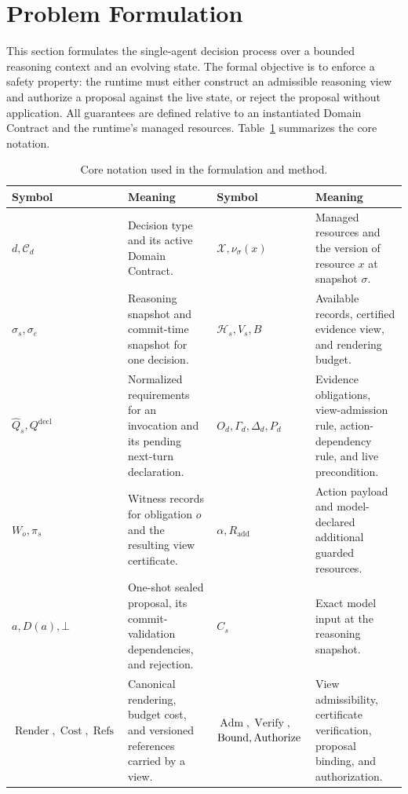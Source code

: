\section{Problem Formulation}
\label{sec:problem}
This section formulates the single-agent decision process over a bounded reasoning context and an evolving state. The formal objective is to enforce a safety property: the runtime must either construct an admissible reasoning view and authorize a proposal against the live state, or reject the proposal without application. All guarantees are defined relative to an instantiated Domain Contract and the runtime's managed resources. Table~\ref{tab:notation} summarizes the core notation.
\begin{table}[htbp]
    \centering
    \small
    \setlength{\tabcolsep}{4pt}
    \caption{Core notation used in the formulation and method.}
    \label{tab:notation}
    \begin{tabular}{@{}p{}p{}
                        p{}p{}@{}}
    \toprule
    \textbf{Symbol} & \textbf{Meaning}
    & \textbf{Symbol} & \textbf{Meaning} \\
    \midrule
    $d,\mathcal C_d$ &
    Decision type and its active Domain Contract.
    & $\mathcal X,\nu_{\sigma}(x)$ &
    Managed resources and the version of resource $x$ at snapshot $\sigma$.
    \\
    $\sigma_s,\sigma_e$ &
    Reasoning snapshot and commit-time snapshot for one decision.
    & $\mathcal H_s,V_s,B$ &
    Available records, certified evidence view, and rendering budget.
    \\
    $\widehat Q_s,Q^{\mathrm{decl}}$ &
    Normalized requirements for an invocation and its pending next-turn declaration.
    & $O_d,\Gamma_d,\Delta_d,P_d$ &
    Evidence obligations, view-admission rule, action-dependency rule, and live precondition.
    \\
    $W_o,\pi_s$ &
    Witness records for obligation $o$ and the resulting view certificate.
    & $\alpha,R_{\mathrm{add}}$ &
    Action payload and model-declared additional guarded resources.
    \\
    $a,D(a),\bot$ &
    One-shot sealed proposal, its commit-validation dependencies, and rejection.
    & $C_s$ &
    Exact model input at the reasoning snapshot.
    \\
    $\operatorname{Render},\operatorname{Cost},\operatorname{Refs}$ &
    Canonical rendering, budget cost, and versioned references carried by a view.
    & $\operatorname{Adm},\operatorname{Verify},$
      $\operatorname{Bound},\operatorname{Authorize}$ &
    View admissibility, certificate verification, proposal binding, and authorization.
    \\
    \bottomrule
    \end{tabular}
\end{table}

